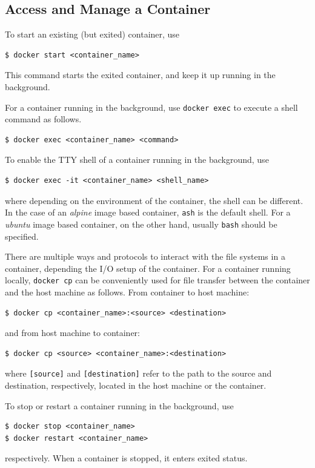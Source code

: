\subsection{Access and Manage a Container}

To start an existing (but exited) container, use
\begin{lstlisting}
$ docker start <container_name>
\end{lstlisting}
This command starts the exited container, and keep it up running in the background.

For a container running in the background, use \verb|docker exec| to execute a shell command as follows.
\begin{lstlisting}
$ docker exec <container_name> <command>
\end{lstlisting}

To enable the TTY shell of a container running in the background, use
\begin{lstlisting}
$ docker exec -it <container_name> <shell_name>
\end{lstlisting}
where depending on the environment of the container, the shell can be different. In the case of an \textit{alpine} image based container, \verb|ash| is the default shell. For a \textit{ubuntu} image based container, on the other hand, usually \verb|bash| should be specified.

There are multiple ways and protocols to interact with the file systems in a container, depending the I/O setup of the container. For a container running locally, \verb|docker cp| can be conveniently used for file transfer between the container and the host machine as follows. From container to host machine:
\begin{lstlisting}
$ docker cp <container_name>:<source> <destination>
\end{lstlisting}
and from host machine to container:
\begin{lstlisting}
$ docker cp <source> <container_name>:<destination>
\end{lstlisting}
where \verb|[source]| and \verb|[destination]| refer to the path to the source and destination, respectively, located in the host machine or the container.

To stop or restart a container running in the background, use
\begin{lstlisting}
$ docker stop <container_name>
$ docker restart <container_name>
\end{lstlisting}
respectively. When a container is stopped, it enters exited status.

